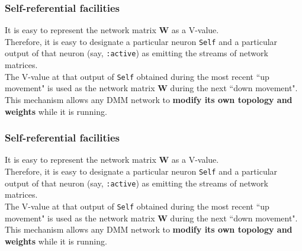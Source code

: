\documentclass{beamer}
\newcommand{\msgray}[1]{{\color{mygray} #1}}
\begin{document}
\begin{frame}

  \frametitle{Self-referential facilities}

It is easy to represent the network matrix {\bf W} as a V-value.\\[2ex]

Therefore, it is easy to designate a particular neuron {\tt Self} and a
particular output of that neuron (say, {\tt :active}) as emitting the streams
of network matrices.\\[2ex]

The V-value at that output of {\tt Self} obtained during the most recent
``up movement" is used as the network matrix {\bf W} during the
next ``down movement".\\[2ex]

\msgray{This mechanism allows any DMM network to {\bf modify its own topology and weights}
while it is running.}

\end{frame}

\begin{frame}

  \frametitle{Self-referential facilities}

It is easy to represent the network matrix {\bf W} as a V-value.\\[2ex]

Therefore, it is easy to designate a particular neuron {\tt Self} and a
particular output of that neuron (say, {\tt :active}) as emitting the streams
of network matrices.\\[2ex]

The V-value at that output of {\tt Self} obtained during the most recent
``up movement" is used as the network matrix {\bf W} during the
next ``down movement".\\[2ex]

This mechanism allows any DMM network to {\bf modify its own topology and weights}
while it is running.

\end{frame}
\end{document}
